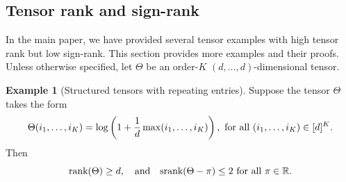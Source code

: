 \documentclass[11pt]{article}
\theoremstyle{plain}
\theoremstyle{definition}
\newtheorem{example}{Example}[section]
\def\srank{\textup{srank}}
\def\rank{\textup{rank}}
\begin{document}
\subsection{Tensor rank and sign-rank}\label{sec:high-rank}
In the main paper, we have provided several tensor examples with high tensor rank but low sign-rank. This section provides more examples and their proofs. 
Unless otherwise specified, let $\Theta$ be an order-$K$ $(d,\ldots,d)$-dimensional tensor. 
\begin{example}[Structured tensors with repeating entries]\label{example:max} Suppose the tensor $\Theta$ takes the form 
\[
\Theta(i_1,\ldots,i_K)=\log\left(1+{1\over d}\max(i_1,\ldots,i_K)\right), \ \text{for all }(i_1,\ldots,i_K)\in[d]^K.
\]
 Then 
 \[
 \rank(\Theta)\geq d, \quad \text{and}\quad \srank(\Theta-\pi)\leq 2\ \text{for all }\pi\in\mathbb{R}. 
 \]
\end{example}
\end{document}
